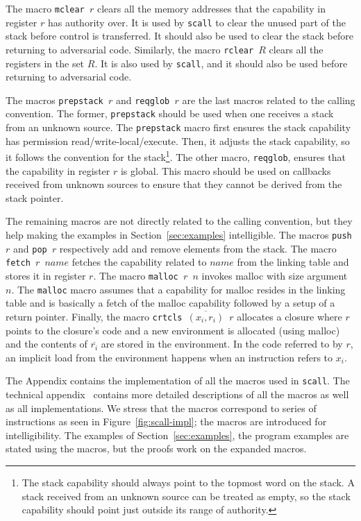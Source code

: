 \documentclass[format=acmsmall, review=true, screen=true]{acmart}
\renewcommand{\figurename}{Figure}
\renewcommand{\sectionname}{Section}
\newcommand{\var}[1]{\mathit{#1}}
\newenvironment{toplas}%
    {\color{OliveGreen}}{}
\newcommand{\itoplassug}[1]{}
\begin{document}
\begin{toplas}
The macro \texttt{mclear $r$} clears all the memory addresses that the
capability in register $r$ has authority over. It is used by \texttt{scall} to
clear the unused part of the stack before control is transferred. It should also
be used to clear the stack before returning to adversarial code. Similarly, the
macro \texttt{rclear $R$} clears all the registers in the set
$R$. It is also used by \texttt{scall}, and it should also be used before
returning to adversarial code.

The macros \texttt{prepstack $r$} and \texttt{reqglob
    $r$} are the last macros related to the calling convention. The former,
\texttt{prepstack} should be used when one receives a stack from an unknown
source. The \texttt{prepstack} macro first ensures the stack capability has permission
read/write-local/execute. Then, it adjusts the stack capability, so it
follows the convention for the stack\footnote{The stack capability should always
point to the topmost word on the stack. A stack received from an unknown source
can be treated as empty, so the stack capability should point just outside its
range of authority.}. The other macro, \texttt{reqglob}, ensures that the
capability in register $r$ is global. This macro should be used on callbacks
received from unknown sources to ensure that they cannot be derived from the
stack pointer.

The remaining macros are not directly related to the calling convention, but
they help making the examples in \sectionname~\ref{sec:examples} intelligible.
The macros \texttt{push $r$} and \texttt{pop $r$} respectively add and remove
elements from the stack. The macro \texttt{fetch $r$ $\var{name}$} fetches the
capability related to $\var{name}$ from the linking table and stores it in
register $r$. The macro \texttt{malloc $r$ $n$} invokes malloc with size
argument $n$. The \texttt{malloc} macro assumes that a capability for malloc
resides in the linking table and is basically a fetch of the malloc capability
followed by a setup of a return pointer. Finally, the macro \texttt{crtcls
  $\overline{(x_i,r_i)}$ $r$} allocates a closure where $r$ points to the
closure's code and a new environment is allocated (using malloc) and the
contents of $\overline{r_i}$ are stored in the environment. In the code referred
to by $r$, an implicit load from the environment happens when an instruction
refers to $x_i$.

The Appendix contains the implementation of all the macros used in
\texttt{scall}. The technical appendix~\citep{technical_appendix} contains more
detailed descriptions of all the macros as well as all implementations.
We stress that the macros correspond to series of instructions as seen in
\figurename~\ref{fig:scall-impl}; the macros
are introduced for intelligibility. The examples of
\sectionname~\ref{sec:examples}, the program examples are stated using the
macros, but the proofs work on the expanded macros.
\end{toplas}
\end{document}
